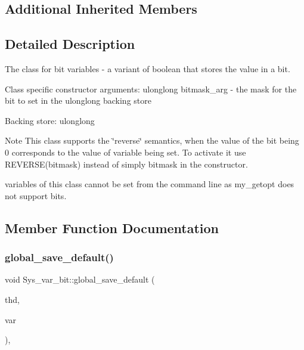 \subsection*{Additional Inherited Members}


\subsection{Detailed Description}
The class for bit variables -\/ a variant of boolean that stores the value in a bit.

Class specific constructor arguments\+: ulonglong bitmask\+\_\+arg -\/ the mask for the bit to set in the ulonglong backing store

Backing store\+: ulonglong

\begin{DoxyNote}{Note}
This class supports the \char`\"{}reverse\char`\"{} semantics, when the value of the bit being 0 corresponds to the value of variable being set. To activate it use R\+E\+V\+E\+R\+S\+E(bitmask) instead of simply bitmask in the constructor.

variables of this class cannot be set from the command line as my\+\_\+getopt does not support bits. 
\end{DoxyNote}


\subsection{Member Function Documentation}
\mbox{\label{classSys__var__bit_a44c80cb8e9522287ac4788dfc65ad5c0}} 
\subsubsection{\texorpdfstring{global\+\_\+save\+\_\+default()}{global\_save\_default()}}
{\footnotesize\ttfamily void Sys\+\_\+var\+\_\+bit\+::global\+\_\+save\+\_\+default (\begin{DoxyParamCaption}\item[{T\+HD $\ast$}]{thd,  }\item[{\mbox{\hyperlink{classset__var}{set\+\_\+var}} $\ast$}]{var }\end{DoxyParamCaption})\hspace{0.3cm}{\ttfamily [inline]}, {\ttfamily [virtual]}}

